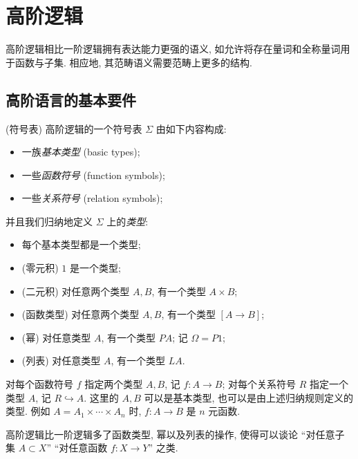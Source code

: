\section{高阶逻辑}

高阶逻辑相比一阶逻辑拥有表达能力更强的语义, 如允许将存在量词和全称量词用于函数与子集. 相应地, 其范畴语义需要范畴上更多的结构.

\subsection{高阶语言的基本要件}


\begin{definition}
	{(符号表)}
	高阶逻辑的一个符号表 $\Sigma$ 由如下内容构成:
	\begin{itemize}
		\item 一族\emph{基本类型} (basic types);
		\item 一些\emph{函数符号} (function symbols);
		\item 一些\emph{关系符号} (relation symbols);
	\end{itemize}
	并且我们归纳地定义 $\Sigma$ 上的\emph{类型}:
	\begin{itemize}
		\item 每个基本类型都是一个类型;
		\item (零元积) $1$ 是一个类型;
		\item (二元积) 对任意两个类型 $A,B$, 有一个类型 $A\times B$;
		\item (函数类型) 对任意两个类型 $A,B$, 有一个类型 $[A\to B]$;
		\item (幂) 对任意类型 $A$, 有一个类型 $PA$; 记 $\Omega = P1$;
		\item (列表) 对任意类型 $A$, 有一个类型 $LA$.
	\end{itemize}
	对每个函数符号 $f$ 指定两个类型 $A,B$, 记 $f\colon A\to B$;
	对每个关系符号 $R$ 指定一个类型 $A$, 记 $R\hookrightarrow A$.
	这里的 $A,B$ 可以是基本类型, 也可以是由上述归纳规则定义的类型.
	例如 $A=A_1\times \cdots\times A_n$ 时, $f\colon A\to B$ 是 $n$ 元函数.
\end{definition}

高阶逻辑比一阶逻辑多了函数类型, 幂以及列表的操作, 使得可以谈论 ``对任意子集 $A\subset X$'' ``对任意函数 $f\colon X\to Y$'' 之类.



